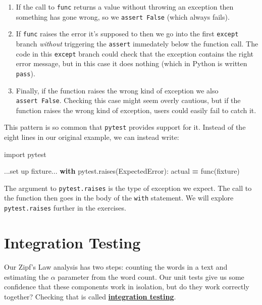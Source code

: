 \documentclass[
]{krantz}
\makeatletter
\newenvironment{Shaded}{\begin{snugshade}}{\end{snugshade}}
\newcommand{\BuiltInTok}[1]{#1}
\newcommand{\ControlFlowTok}[1]{\textcolor[rgb]{0.13,0.29,0.53}{\textbf{#1}}}
\newcommand{\ImportTok}[1]{#1}
\newcommand{\NormalTok}[1]{#1}
\newcommand{\OperatorTok}[1]{\textcolor[rgb]{0.81,0.36,0.00}{\textbf{#1}}}
\newenvironment{kframe}{%
\medskip{}
\setlength{\fboxsep}{.8em}
 \def\at@end@of@kframe{}%
 \ifinner\ifhmode%
  \def\at@end@of@kframe{\end{minipage}}%
  \begin{minipage}{\columnwidth}%
 \fi\fi%
 \def\FrameCommand##1{\hskip\@totalleftmargin \hskip-\fboxsep
 \colorbox{shadecolor}{##1}\hskip-\fboxsep
     \hskip-\linewidth \hskip-\@totalleftmargin \hskip\columnwidth}%
 \MakeFramed {\advance\hsize-\width
   \@totalleftmargin\z@ \linewidth\hsize
   \@setminipage}}%
 {\par\unskip\endMakeFramed%
 \at@end@of@kframe}
\renewenvironment{Shaded}{\begin{kframe}}{\end{kframe}}
\newcommand{\gref}[2]{\hyperlink{#2}{\textbf{#1}}}
\makeatother
\begin{document}
\begin{enumerate}
\def\labelenumi{\arabic{enumi}.}
\item
  If the call to \texttt{func} returns a value without throwing an exception
  then something has gone wrong,
  so we \texttt{assert\ False} (which always fails).
\item
  If \texttt{func} raises the error it's supposed to
  then we go into the first \texttt{except} branch
  \emph{without} triggering the \texttt{assert} immedately below the function call.
  The code in this \texttt{except} branch could check that
  the exception contains the right error message,
  but in this case it does nothing
  (which in Python is written \texttt{pass}).
\item
  Finally,
  if the function raises the wrong kind of exception
  we also \texttt{assert\ False}.
  Checking this case might seem overly cautious,
  but if the function raises the wrong kind of exception,
  users could easily fail to catch it.
\end{enumerate}

This pattern is so common that \texttt{pytest} provides support for it.
Instead of the eight lines in our original example,
we can instead write:

\begin{Shaded}
\begin{Highlighting}[]
\ImportTok{import}\NormalTok{ pytest}

\NormalTok{...}\BuiltInTok{set}\NormalTok{ up fixture...}
\ControlFlowTok{with}\NormalTok{ pytest.raises(ExpectedError):}
\NormalTok{    actual }\OperatorTok{=}\NormalTok{ func(fixture)}
\end{Highlighting}
\end{Shaded}

The argument to \texttt{pytest.raises} is the type of exception we expect.
The call to the function then goes in the body of the \texttt{with} statement.
We will explore \texttt{pytest.raises} further in the exercises.

\hypertarget{testing-integration}{%
\section{Integration Testing}\label{testing-integration}}

Our Zipf's Law analysis has two steps:
counting the words in a text
and estimating the \(\alpha\) parameter from the word count.
Our unit tests give us some confidence that these components work in isolation,
but do they work correctly together?
Checking that is called \gref{integration testing}{integration\_test}.
\end{document}
